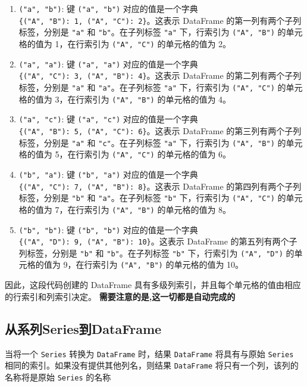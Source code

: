 \documentclass[11pt]{ctexart}
\begin{document}
\begin{enumerate}
\def\labelenumi{\arabic{enumi}.}
\item
  \texttt{("a",\ "b")}: 键 \texttt{("a",\ "b")} 对应的值是一个字典
  \texttt{\{("A",\ "B"):\ 1,\ ("A",\ "C"):\ 2\}}。这表示 DataFrame
  的第一列有两个子列标签，分别是 \texttt{"a"} 和
  \texttt{"b"}。在子列标签 \texttt{"a"} 下，行索引为
  \texttt{("A",\ "B")} 的单元格的值为 1，在行索引为 \texttt{("A",\ "C")}
  的单元格的值为 2。
\item
  \texttt{("a",\ "a")}: 键 \texttt{("a",\ "a")} 对应的值是一个字典
  \texttt{\{("A",\ "C"):\ 3,\ ("A",\ "B"):\ 4\}}。这表示 DataFrame
  的第二列有两个子列标签，分别是 \texttt{"a"} 和
  \texttt{"a"}。在子列标签 \texttt{"a"} 下，行索引为
  \texttt{("A",\ "C")} 的单元格的值为 3，在行索引为 \texttt{("A",\ "B")}
  的单元格的值为 4。
\item
  \texttt{("a",\ "c")}: 键 \texttt{("a",\ "c")} 对应的值是一个字典
  \texttt{\{("A",\ "B"):\ 5,\ ("A",\ "C"):\ 6\}}。这表示 DataFrame
  的第三列有两个子列标签，分别是 \texttt{"a"} 和
  \texttt{"c"}。在子列标签 \texttt{"a"} 下，行索引为
  \texttt{("A",\ "B")} 的单元格的值为 5，在行索引为 \texttt{("A",\ "C")}
  的单元格的值为 6。
\item
  \texttt{("b",\ "a")}: 键 \texttt{("b",\ "a")} 对应的值是一个字典
  \texttt{\{("A",\ "C"):\ 7,\ ("A",\ "B"):\ 8\}}。这表示 DataFrame
  的第四列有两个子列标签，分别是 \texttt{"b"} 和
  \texttt{"a"}。在子列标签 \texttt{"b"} 下，行索引为
  \texttt{("A",\ "C")} 的单元格的值为 7，在行索引为 \texttt{("A",\ "B")}
  的单元格的值为 8。
\item
  \texttt{("b",\ "b")}: 键 \texttt{("b",\ "b")} 对应的值是一个字典
  \texttt{\{("A",\ "D"):\ 9,\ ("A",\ "B"):\ 10\}}。这表示 DataFrame
  的第五列有两个子列标签，分别是 \texttt{"b"} 和
  \texttt{"b"}。在子列标签 \texttt{"b"} 下，行索引为
  \texttt{("A",\ "D")} 的单元格的值为 9，在行索引为 \texttt{("A",\ "B")}
  的单元格的值为 10。
\end{enumerate}

因此，这段代码创建的 DataFrame
具有多级列索引，并且每个单元格的值由相应的行索引和列索引决定。
\textbf{需要注意的是,这一切都是自动完成的}

    \hypertarget{ux4eceux7cfbux5217seriesux5230dataframe}{%
\subsection{从系列Series到DataFrame}\label{ux4eceux7cfbux5217seriesux5230dataframe}}

当将一个 \texttt{Series} 转换为 \texttt{DataFrame} 时，结果
\texttt{DataFrame} 将具有与原始 \texttt{Series}
相同的索引。如果没有提供其他列名，则结果 \texttt{DataFrame}
将只有一个列，该列的名称将是原始 \texttt{Series} 的名称
\end{document}
